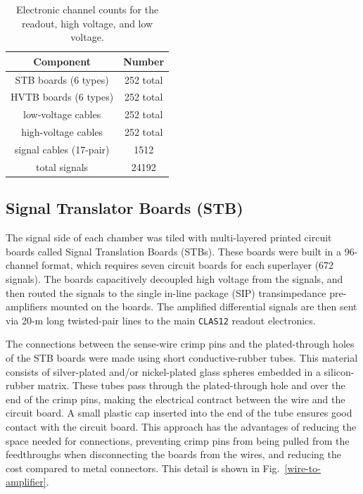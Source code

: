\begin{table}[htbp]
\begin{center}
\begin{tabular} {||c|c||} \hline \hline
{\bf Component}           & {\bf Number} \\ \hline
STB boards (6 types)      & 252 total \\ \hline
HVTB boards (6 types)     & 252 total \\ \hline
low-voltage cables        & 252 total  \\ \hline
high-voltage cables       & 252 total  \\ \hline
signal cables (17-pair)   & 1512 \\ \hline
total signals             & 24192 \\ \hline \hline
\end{tabular}
\caption{\small{Electronic channel counts for the readout, high voltage,
and low voltage.}}
\label{electronic-components}
\end{center}
\end{table}

\subsection{Signal Translator Boards (STB)}

The signal side of each chamber was tiled with multi-layered printed circuit 
boards called Signal Translation Boards (STBs).  These boards were  
built in a 96-channel format, which requires seven 
circuit boards for each superlayer (672 signals).   The boards  
capacitively decoupled high voltage from the signals, and then routed 
the signals to the single in-line package (SIP) transimpedance pre-amplifiers 
mounted on the boards.  The amplified differential signals are then sent 
via 20-m long twisted-pair lines to the main {\tt CLAS12} readout electronics.

The connections between the sense-wire crimp pins and the plated-through holes 
of the STB boards were made using short conductive-rubber tubes.  This material 
consists of silver-plated and/or nickel-plated glass spheres embedded in a 
silicon-rubber matrix.  These tubes pass through the plated-through hole and 
over the end of the crimp pins, making the electrical contract between the 
wire and the circuit board.  A small plastic cap inserted into the end of the 
tube ensures good contact with the circuit board.  This approach has the 
advantages of reducing the space needed for connections, preventing crimp pins 
from being pulled from the feedthroughs when disconnecting the boards from the 
wires, and reducing the cost compared to metal connectors.  This detail is 
shown in Fig.~\ref{wire-to-amplifier}.


